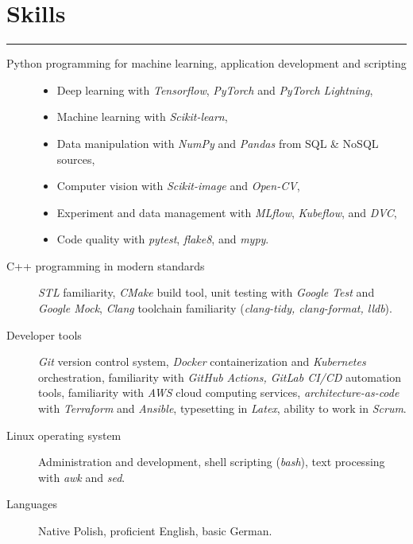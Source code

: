 \documentclass{article}
\begin{document}
\section*{Skills}

\hrule \medskip

{
\begin{description}
	\item[Python programming for machine learning, application development and scripting]
		\begin{itemize}
			\item Deep learning with \textit{Tensorflow}, \textit{PyTorch} and \textit{PyTorch Lightning},
			\item Machine learning with \textit{Scikit-learn},
			\item Data manipulation with \textit{NumPy} and \textit{Pandas} from SQL \& NoSQL sources,
			\item Computer vision with \textit{Scikit-image} and \textit{Open-CV},
			\item Experiment and data management with \textit{MLflow}, \textit{Kubeflow}, and \textit{DVC},
			\item Code quality with \textit{pytest}, \textit{flake8}, and \textit{mypy}.
		\end{itemize}
	\item[C++ programming in modern standards]
		\textit{STL} familiarity,
		\textit{CMake} build tool,
		unit testing with \textit{Google Test} and \textit{Google Mock},
		\textit{Clang} toolchain familiarity (\textit{clang-tidy, clang-format, lldb}).
	\item[Developer tools]
			\textit{Git} version control system,
			\textit{Docker} containerization and \textit{Kubernetes} orchestration,
			familiarity with \textit{GitHub Actions, GitLab CI/CD} automation tools,
			familiarity with \textit{AWS} cloud computing services,
			\textit{architecture-as-code} with \textit{Terraform} and \textit{Ansible}, 
			typesetting in \textit{Latex},
			ability to work in \textit{Scrum}.
	\item[Linux operating system]
		Administration and development,
		shell scripting (\textit{bash}),
		text processing with \textit{awk} and \textit{sed}.
	\item[Languages]
		Native Polish,
		proficient English,
		basic German.
\end{description}
}
\end{document}

